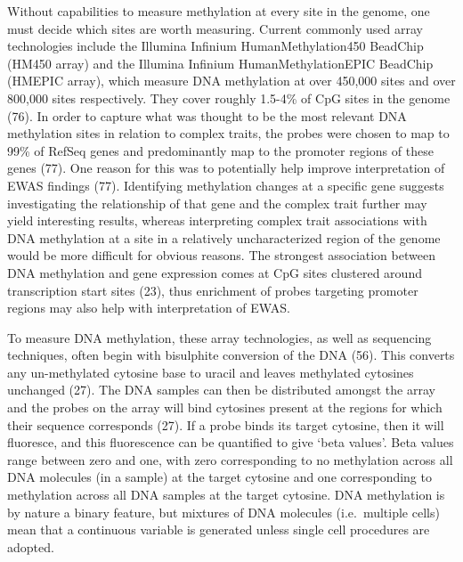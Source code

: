 \documentclass[11pt,twoside]{bristolthesis}
\begin{document}
Without capabilities to measure methylation at every site in the genome, one must decide which sites are worth measuring. Current commonly used array technologies include the Illumina Infinium HumanMethylation450 BeadChip (HM450 array) and the Illumina Infinium HumanMethylationEPIC BeadChip (HMEPIC array), which measure DNA methylation at over 450,000 sites and over 800,000 sites respectively. They cover roughly 1.5-4\% of CpG sites in the genome (76). In order to capture what was thought to be the most relevant DNA methylation sites in relation to complex traits, the probes were chosen to map to 99\% of RefSeq genes and predominantly map to the promoter regions of these genes (77). One reason for this was to potentially help improve interpretation of EWAS findings (77). Identifying methylation changes at a specific gene suggests investigating the relationship of that gene and the complex trait further may yield interesting results, whereas interpreting complex trait associations with DNA methylation at a site in a relatively uncharacterized region of the genome would be more difficult for obvious reasons. The strongest association between DNA methylation and gene expression comes at CpG sites clustered around transcription start sites (23), thus enrichment of probes targeting promoter regions may also help with interpretation of EWAS.

To measure DNA methylation, these array technologies, as well as sequencing techniques, often begin with bisulphite conversion of the DNA (56). This converts any un-methylated cytosine base to uracil and leaves methylated cytosines unchanged (27). The DNA samples can then be distributed amongst the array and the probes on the array will bind cytosines present at the regions for which their sequence corresponds (27). If a probe binds its target cytosine, then it will fluoresce, and this fluorescence can be quantified to give `beta values'. Beta values range between zero and one, with zero corresponding to no methylation across all DNA molecules (in a sample) at the target cytosine and one corresponding to methylation across all DNA samples at the target cytosine. DNA methylation is by nature a binary feature, but mixtures of DNA molecules (i.e.~multiple cells) mean that a continuous variable is generated unless single cell procedures are adopted.
\end{document}
